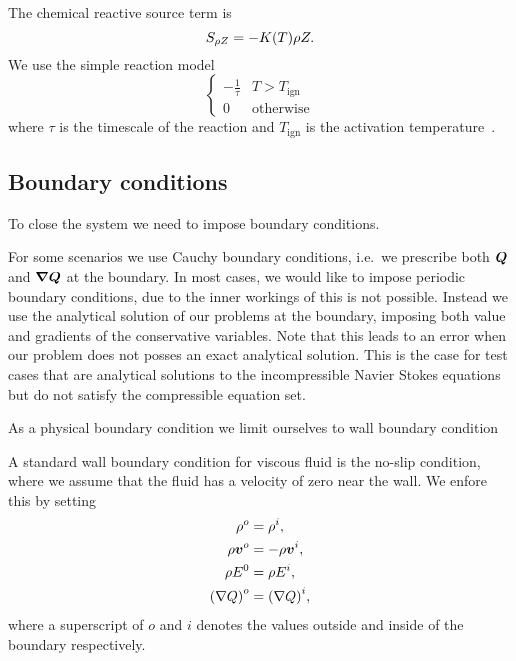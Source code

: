 \newcommand{\reactionTimescale}{\tau}
\newcommand{\reactionTemperature}{T_{\text{ign}}}
The chemical reactive source term is
\begin{equation}\label{eq:source-reaction}
  \source[\QZ] = - K(T) \QZ.
\end{equation}
We use the simple reaction model
\begin{equation}\label{eq:reaction-model}
\begin{cases}
  - \frac{1}{\reactionTimescale} & T > \reactionTemperature\\
  0 & \text{otherwise}
\end{cases}  
\end{equation}
where $\reactionTimescale$ is the timescale of the reaction and $\reactionTemperature$ is the activation temperature~\cite{hidalgo2011ader,helzel2000modified}.

\subsection{Boundary conditions}
To close the system we need to impose boundary conditions.

For some scenarios we use Cauchy boundary conditions, i.e.\ we prescribe both $\bm{Q}$ and $\gradQ$ at the boundary.
In most cases, we would like to impose periodic boundary conditions, due to the inner workings of \exahype{} this is not possible.
Instead we use the analytical solution of our problems at the boundary, imposing both value and gradients of the conservative variables.
Note that this leads to an error when our problem does not posses an exact analytical solution.
This is the case for test cases that are analytical solutions to the incompressible Navier Stokes equations but do not satisfy the compressible equation set.

As a physical boundary condition we limit ourselves to wall boundary condition

A standard wall boundary condition for viscous fluid is the no-slip condition, where we assume that the fluid has a velocity of zero near the wall.
We enfore this by setting
\begin{align}
  \label{eq:no-slip}
  \begin{split}
  \rho^o &= \rho^i, \\
  \rho \bm{v}^o &= -\rho \bm{v}^i, \\
  \rho E^0 &= \rho E^i,\\
  {(\nabla Q)}^o &= {(\nabla Q)}^i,
  \end{split}
\end{align}
where a superscript of $o$ and $i$ denotes the values outside and inside of the boundary respectively.

